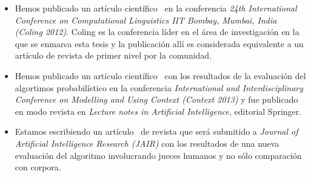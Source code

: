\begin{itemize}
\item Hemos publicado un art\'iculo cient\'ifico~\cite{arec:2012:coling12} en la conferencia \emph{24th International Conference on Computational Linguistics IIT Bombay, Mumbai, India (Coling 2012)}. Coling es la conferencia l\'ider en el \'area de investigaci\'on en la que se enmarca esta tesis y la publicaci\'on all\'i es considerada equivalente a un art\'iculo de revista de primer nivel por la comunidad. 
\item Hemos publicado un art\'iculo cient\'ifico~\cite{benotti-altamirano-context2013} con los resultados de la evaluaci\'on del algortimos probabil\'istico en la conferencia \emph{International and Interdisciplinary Conference on Modelling and Using Context (Context 2013)} y fue publicado en modo revista en \emph{Lecture notes in Artificial Intelligence}, editorial Springer. 
\item Estamos escribiendo un art\'iculo~\cite{benotti-altamirano-jair} de revista que ser\'a submitido a \emph{Journal of Artificial Intelligence Research (JAIR)} con los resultados de una nueva evaluaci\'on del algoritmo involucrando jueces humanos y no s\'olo comparaci\'on con corpora.
\end{itemize}

